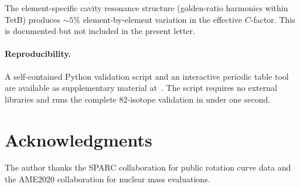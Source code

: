 \documentclass[twocolumn]{iopjournal}
\begin{document}
The element-specific cavity resonance structure (golden-ratio
harmonics within TetB) produces $\sim\!5\%$ element-by-element
variation in the effective $C$-factor. This is documented
but not included in the present letter.

\paragraph{Reproducibility.}
A self-contained Python validation script and an interactive
periodic table tool are available as supplementary material
at~\cite{zenodo2025}. The script requires no external libraries
and runs the complete 82-isotope validation in under one second.


\section*{Acknowledgments}
The author thanks the SPARC collaboration for public rotation
curve data and the AME2020 collaboration for nuclear mass
evaluations.
\end{document}
